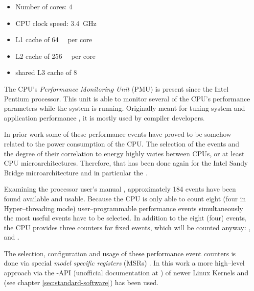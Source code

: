 \begin{itemize}

\item Number of cores: 4

\item CPU clock speed: \SI{3.4}{\giga\hertz}

\item L1 cache of \SI{64}{\kibi\byte} per core\cite{intel2011softdev1}

\item L2 cache of \SI{256}{\kibi\byte} per core\cite{intel2011softdev1}

\item shared L3 cache of \SI{8}{\mebi\byte}\cite{intel2011softdev1}

\end{itemize}


\label{sec:pmu}

The CPU's \emph{Performance Monitoring Unit} (PMU) is present since the
Intel\TReg{} Pentium processor. This unit is able to monitor several of the
CPU's performance parameters while the system is running. Originally meant for
tuning system and application performance \cite{intel2011softdev3b}, it is
mostly used by compiler developers.

In prior work \cite{bellosa2000benefits,snowdon2010operating,
weissel2002process,kellner03tempcontrol,bertran2010decomposable} some of these
performance events have proved to be somehow related to the power consumption of
the CPU. The selection of the events and the degree of their correlation to
energy highly varies between CPUs, or at least CPU microarchitectures.
Therefore, that has been done again for the Intel\TReg{} Sandy Bridge
microarchitecture and in particular the \JWPcpu{}.

Examining the processor user's manual \cite{intel2011events}, approximately 184
events have been found available and usable. Because the CPU is only able to
count eight (four in Hyper--threading \cite{wiki:HT} mode) user--programmable
performance events simultaneously \cite{intel2011softdev1} the most useful
events have to be selected. In addition to the eight (four) events, the CPU
provides three counters for fixed events, which will be counted anyway:
,  and
.

The selection, configuration and usage of these performance event counters is
done via special \emph{model specific registers} (MSRs)
\cite{intel2011softdev3b}. In this work a more high--level approach via the
-API (unofficial documentation at
\cite{weaver2011perfevents}) of newer Linux Kernels and \JWTlibpfm{} (see
chapter \ref{sec:standard-software}) has been used.


